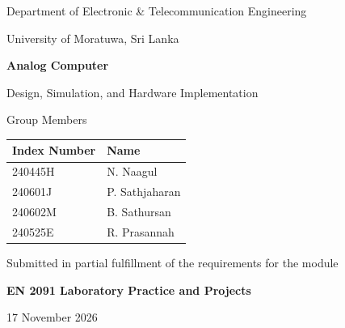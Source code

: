 \documentclass[11pt,a4paper]{article}
\newcommand{\ReportDate}{17 November 2026}
\begin{document}
\begin{titlepage}
\centering
\vspace*{0.5cm}
{\large Department of Electronic \& Telecommunication Engineering\par}
{\large University of Moratuwa, Sri Lanka\par}
\vspace{2.2cm}
{\LARGE\bfseries Analog Computer\par}
\vspace{0.5cm}
{\large Design, Simulation, and Hardware Implementation\par}
\vspace{2.5cm}
{\large Group Members\par}
\vspace{0.4cm}
\begin{tabular}{ll}
\toprule
\textbf{Index Number} & \textbf{Name}\\
\midrule
240445H & N. Naagul\\
240601J & P. Sathjaharan\\
240602M & B. Sathursan\\
240525E & R. Prasannah\\
\bottomrule
\end{tabular}
\vfill
Submitted in partial fulfillment of the requirements for the module\par
\textbf{EN 2091 Laboratory Practice and Projects}\par
\vspace{1cm}
{\large\ReportDate\par}
\end{titlepage}
\end{document}
